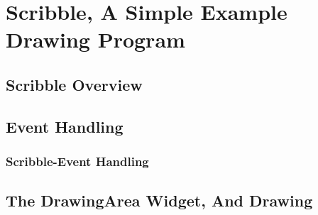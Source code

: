 \chapter{Scribble, A Simple Example Drawing Program}
\section{Scribble Overview}
\section{Event Handling}
	\subsection{Scribble-Event Handling}
\section{The DrawingArea Widget, And Drawing}
